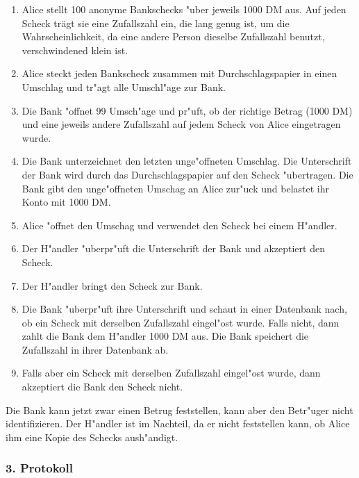 \begin{enumerate}
  \item Alice stellt 100 anonyme Bankschecks "uber jeweils 1000 DM
        aus. Auf jeden Scheck tr\"agt sie eine Zufallszahl ein, die lang
        genug ist, um die Wahrscheinlichkeit, da\3 eine andere Person
        dieselbe Zufallszahl benutzt, verschwindened klein ist.
  \item Alice steckt jeden Bankscheck zusammen mit Durchschlagspapier
        in einen Umschlag und tr"agt alle Umschl"age zur Bank.
  \item Die Bank "offnet 99 Umsch"age und pr"uft, ob der richtige
        Betrag (1000 DM) und eine jeweils andere Zufallszahl auf jedem
        Scheck von Alice eingetragen wurde.
  \item Die Bank unterzeichnet den letzten unge"offneten Umschlag. Die
        Unterschrift der Bank wird durch das Durchschlagspapier auf
        den Scheck "ubertragen.  Die Bank gibt den unge"offneten
        Umschag an Alice zur"uck und belastet ihr Konto mit 1000 DM.
  \item Alice "offnet den Umschag und verwendet den Scheck bei einem
        H"andler.
  \item Der H"andler "uberpr"uft die Unterschrift der Bank und
        akzeptiert den Scheck.
  \item Der H"andler bringt den Scheck zur Bank.
  \item Die Bank "uberpr"uft ihre Unterschrift und schaut in einer
        Datenbank nach, ob ein Scheck mit derselben Zufallszahl
        eingel"ost wurde. Falls nicht, dann zahlt die Bank dem
        H"andler 1000 DM aus. Die Bank speichert die Zufallszahl in
        ihrer Datenbank ab.
  \item Falls aber ein Scheck mit derselben Zufallszahl eingel"ost
        wurde, dann akzeptiert die Bank den Scheck nicht.
\end{enumerate}
Die Bank kann jetzt zwar einen Betrug feststellen, kann aber den 
Betr"uger nicht identifizieren. Der H"andler ist im Nachteil, da er nicht 
feststellen kann, ob Alice ihm eine Kopie des Schecks aush"andigt. 

\subsubsection*{3. Protokoll}

